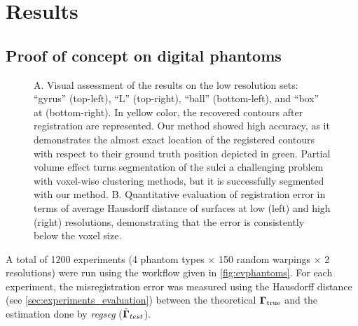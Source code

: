 \section{Results}
\label{sec:results}

\subsection{Proof of concept on digital phantoms}
\label{sec:results_phantom}

\begin{figure*}
    \centering
  \caption{A. Visual assessment of the results on the low resolution sets:
    ``gyrus'' (top-left), ``L'' (top-right), ``ball'' (bottom-left),
    and ``box'' at (bottom-right).
  In yellow color, the recovered contours after registration are represented.
  Our method showed high accuracy, as it demonstrates the almost exact location of the registered
    contours with respect to their ground truth position depicted in green.
  Partial volume effect turns segmentation of the sulci a challenging problem with voxel-wise
    clustering methods, but it is successfully segmented with our method.
  B. Quantitative evaluation of registration error in terms of average Hausdorff distance of
    surfaces at low (left) and high (right) resolutions, demonstrating that the error is
    consistently below the voxel size.
    }\label{fig:phantom}
\end{figure*}
A total of 1200 experiments (4 phantom types $\times$ 150 random warpings $\times$ 2 resolutions) were
  run using the workflow given in \autoref{fig:evphantoms}.
For each experiment, the misregistration error was measured using the Hausdorff distance
  (see \autoref{sec:experiments_evaluation}) between the theoretical $\boldsymbol{\Gamma}_\text{true}$ and
  the estimation done by \emph{regseg} ($\hat{\boldsymbol{\Gamma}}_{test}$).
